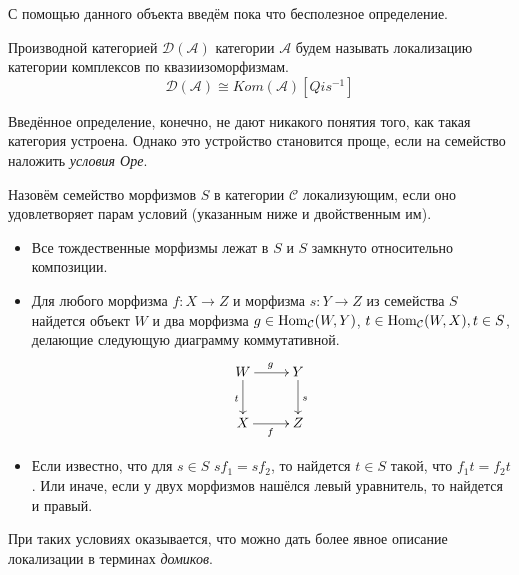 \documentclass[../main.tex]{subfiles}
\begin{document}
  С помощью данного объекта введём пока что бесполезное определение.
  \begin{to_def}\label{DerCat}
    Производной категорией $\mathcal{D}(\mathcal{A})$ категории $\mathcal{A}$ будем называть локализацию категории комплексов по квазиизоморфизмам.
    \begin{equation*}
      \mathcal{D}(\mathcal{A}) \cong Kom(\mathcal{A})[Qis^{-1}]
    \end{equation*}
\end{to_def}

Введённое определение, конечно, не дают никакого понятия того, как такая категория устроена. 
Однако это устройство становится проще, если на семейство наложить \emph{условия Оре}.

\begin{to_def}
    Назовём семейство морфизмов $S$ в категории $\mathcal{C}$ локализующим, если оно удовлетворяет парам условий (указанным ниже и двойственным им).
    \begin{itemize}
      \item Все тождественные морфизмы лежат в $S$ и $S$ замкнуто относительно композиции.
      \item Для любого морфизма $f:X\to Z$ и морфизма $s:Y\to Z$ из семейства $S$ найдется объект $W$ и два морфизма $g\in \operatorname{Hom}_\mathcal{C}(W, Y)$, $t\in \operatorname{Hom}_\mathcal{C}(W, X), t\in S$, делающие следующую диаграмму коммутативной.
	\begin{equation}\label{ore_2_cond}
	  \xymatrix{W \ar[r]^g \ar[d]_t & Y\ar[d]^s\\
	  X \ar[r]_f & Z}
	\end{equation}
      \item Если известно, что для $s\in S$ $sf_1=sf_2$, то найдется $t\in S$ такой, что $f_1t=f_2t$. 
	Или иначе, если у двух морфизмов нашёлся левый уравнитель, то найдется и правый.
    \end{itemize}
      \label{ore_conditions}
    \end{to_def}

    При таких условиях оказывается, что можно дать более явное описание локализации в терминах \emph{домиков}.
\end{document}
